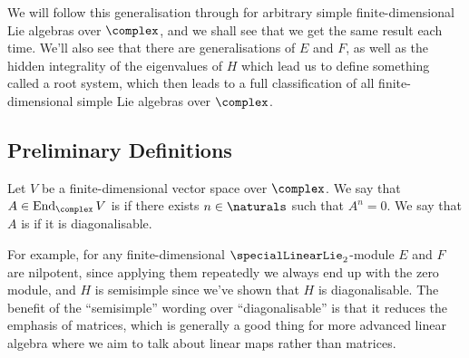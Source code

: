 \documentclass[fleqn]{NotesClass}
\DeclareMathOperator{\End}{End}
\begin{document}
    We will follow this generalisation through for arbitrary simple finite-dimensional Lie algebras over \(\complex\), and we shall see that we get the same result each time.
    We'll also see that there are generalisations of \(E\) and \(F\), as well as the hidden integrality of the eigenvalues of \(H\) which lead us to define something called a root system, which then leads to a full classification of all finite-dimensional simple Lie algebras over \(\complex\).
    
    \subsection{Preliminary Definitions}
    \begin{dfn}{}{}
        Let \(V\) be a finite-dimensional vector space over \(\complex\).
        We say that \(A \in \End_{\complex}V\) is  if there exists \(n \in \naturals\) such that \(A^n = 0\).
        We say that \(A\) is  if it is diagonalisable.
    \end{dfn}
    
    For example, for any finite-dimensional \(\specialLinearLie_2\)-module \(E\) and \(F\) are nilpotent, since applying them repeatedly we always end up with the zero module, and \(H\) is semisimple since we've shown that \(H\) is diagonalisable.
    The benefit of the \enquote{semisimple} wording over \enquote{diagonalisable} is that it reduces the emphasis of matrices, which is generally a good thing for more advanced linear algebra where we aim to talk about linear maps rather than matrices.
    
\end{document}
